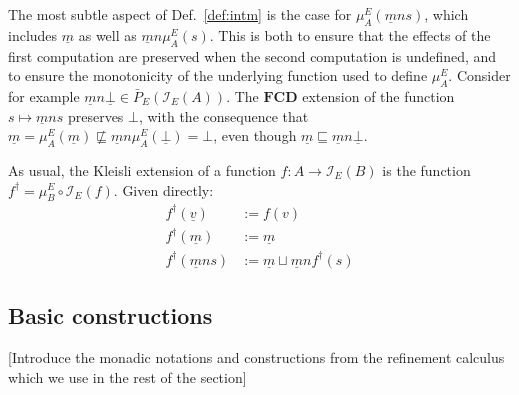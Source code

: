 \documentclass[format=sigplan,authordraft]{acmart}
\begin{document}
The most subtle aspect of Def.~\ref{def:intm}
is the case for $\mu^E_A(\underline{m} n s)$,
which includes $\underline{m}$ as well as $\underline{m} n \mu^E_A(s)$.
This is both
to ensure that the effects of the first computation are preserved
when the second computation is undefined, and
to ensure the monotonicity of the underlying function
used to define $\mu^E_A$.
Consider for example
$\underline{m} n \underline{\bot} \in \bar{P}_E(\mathcal{I}_E(A))$.
The $\mathbf{FCD}$ extension
of the function $s \mapsto \underline{m} n s$
preserves $\bot$,
with the consequence that
$\underline{m} = \mu^E_A(\underline{m}) \nsqsubseteq
 \underline{m} n \mu^E_A(\underline{\bot}) = \bot$,
even though
$\underline{m} \sqsubseteq \underline{m} n \underline{\bot}$.

As usual,
the Kleisli extension of a function $f : A \rightarrow \mathcal{I}_E(B)$
is the function $f^\dagger = \mu^E_B \circ \mathcal{I}_E(f)$.
Given directly:
\begin{align*}
  f^\dagger(\underline{v}) &:= f(v) \\
  f^\dagger(\underline{m}) &:= \underline{m} \\
  f^\dagger(\underline{m} n s) &:=
    \underline{m} \sqcup \underline{m} n f^\dagger(s)
\end{align*}


\subsection{Basic constructions} %

[Introduce the monadic notations and constructions
from the refinement calculus which we use in the rest
of the section]
\end{document}
